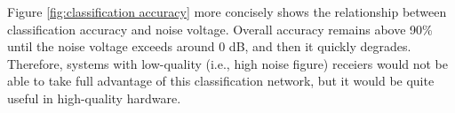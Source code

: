 \documentclass{article}
\begin{document}
Figure \ref{fig:classification accuracy} more concisely shows the relationship
between classification accuracy and noise voltage. Overall accuracy remains
above 90\% until the noise voltage exceeds around 0 dB, and then it quickly
degrades. Therefore, systems with low-quality (i.e., high noise figure) receiers
would not be able to take full advantage of this classification network, but it
would be quite useful in high-quality hardware.


\end{document}
